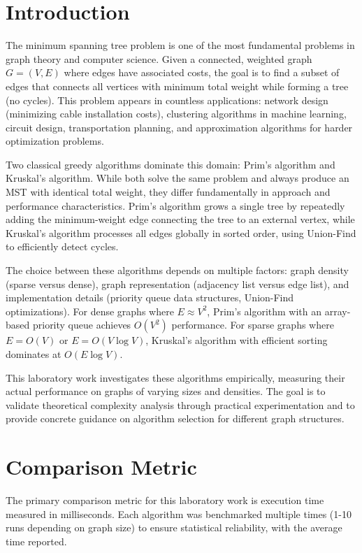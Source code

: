 \documentclass[12pt, a4paper]{report}
\begin{document}
\section{Introduction}

The minimum spanning tree problem is one of the most fundamental problems in graph theory and computer science. Given a connected, weighted graph $G = (V, E)$ where edges have associated costs, the goal is to find a subset of edges that connects all vertices with minimum total weight while forming a tree (no cycles). This problem appears in countless applications: network design (minimizing cable installation costs), clustering algorithms in machine learning, circuit design, transportation planning, and approximation algorithms for harder optimization problems.

Two classical greedy algorithms dominate this domain: Prim's algorithm and Kruskal's algorithm. While both solve the same problem and always produce an MST with identical total weight, they differ fundamentally in approach and performance characteristics. Prim's algorithm grows a single tree by repeatedly adding the minimum-weight edge connecting the tree to an external vertex, while Kruskal's algorithm processes all edges globally in sorted order, using Union-Find to efficiently detect cycles.

The choice between these algorithms depends on multiple factors: graph density (sparse versus dense), graph representation (adjacency list versus edge list), and implementation details (priority queue data structures, Union-Find optimizations). For dense graphs where $E \approx V^2$, Prim's algorithm with an array-based priority queue achieves $O(V^2)$ performance. For sparse graphs where $E = O(V)$ or $E = O(V \log V)$, Kruskal's algorithm with efficient sorting dominates at $O(E \log V)$.

This laboratory work investigates these algorithms empirically, measuring their actual performance on graphs of varying sizes and densities. The goal is to validate theoretical complexity analysis through practical experimentation and to provide concrete guidance on algorithm selection for different graph structures.

\section{Comparison Metric}

The primary comparison metric for this laboratory work is execution time measured in milliseconds. Each algorithm was benchmarked multiple times (1-10 runs depending on graph size) to ensure statistical reliability, with the average time reported.
\end{document}
